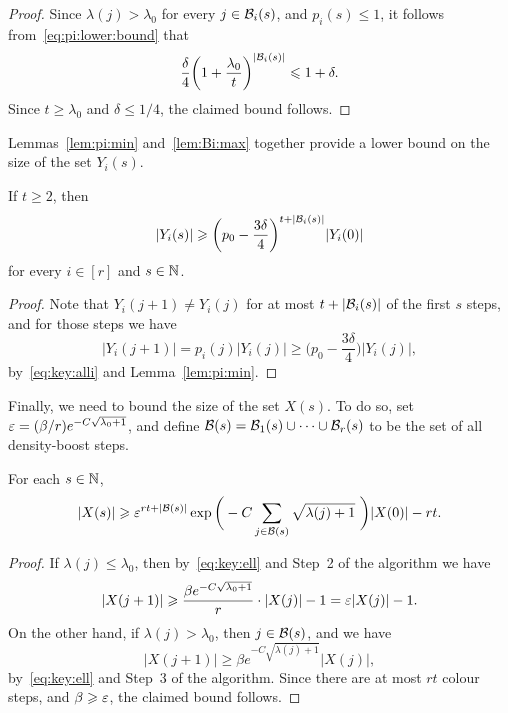 \begin{proof}
  Since $\lambda(j) > \lambda_0$ for every $j \in \mathcal{B}_i(s)$, and $p_i(s) \le 1$, it follows from~\eqref{eq:pi:lower:bound} that
  $$\frac{\delta}{4} \bigg( 1 + \frac{\lambda_0}{t} \bigg)^{|\mathcal{B}_i(s)|} \leqslant 1 + \delta.$$
  Since $t \ge \lambda_0$ and $\delta \le 1/4$, the claimed bound follows. 
\end{proof}

Lemmas~\ref{lem:pi:min} and~\ref{lem:Bi:max} together provide a lower bound on the size of the set $Y_i(s)$. 

\begin{lemma}\label{lem:Y:lower:bound}
  If\/ $t \ge 2$, then
  $$|Y_i(s)| \geqslant \bigg( p_0 - \frac{3\delta}{4} \bigg)^{t + |\mathcal{B}_i(s)|} |Y_i(0)|$$
  for every $i \in [r]$ and $s \in \mathbb{N}$. 
\end{lemma}
  
\begin{proof}
  Note that $Y_i(j+1) \ne Y_i(j)$ for at most $t + |\mathcal{B}_i(s)|$ of the first $s$ steps, and for those steps we have
  $$|Y_i(j+1)| = p_i(j) |Y_i(j)| \ge \bigg( p_0 - \frac{3\delta}{4} \bigg) |Y_i(j)|,$$ 
  by~\eqref{eq:key:alli} and Lemma~\ref{lem:pi:min}.
\end{proof}


Finally, we need to bound the size of the set $X(s)$. To do so, set $\varepsilon = (\beta / r) e^{- C \sqrt{\lambda_0 + 1}}$, and define $\mathcal{B}(s) = \mathcal{B}_1(s) \cup \cdots \cup \mathcal{B}_r(s)$ to be the set of all density-boost steps. 

\begin{lemma}\label{lem:X:lower:bound}
  For each $s \in \mathbb{N}$, 
  \begin{equation}\label{eq:X:lower:bound}
  |X(s)| \geqslant \varepsilon^{rt + |\mathcal{B}(s)|} \exp\bigg( - C \sum_{j \in \mathcal{B}(s)} \sqrt{\lambda(j)+1}\,\, \bigg) |X(0)| - rt.
  \end{equation}
\end{lemma}

\begin{proof}
  If $\lambda(j) \le \lambda_0$, then by~\eqref{eq:key:ell} and Step~2 of the algorithm we have
  $$|X(j+1)| \geqslant \frac{\beta e^{- C \sqrt{\lambda_0 + 1}}}{r} \cdot |X(j)| - 1 = \varepsilon |X(j)| - 1.$$ 
  On the other hand, if $\lambda(j) > \lambda_0$, then $j \in \mathcal{B}(s)$, and we have 
  $$|X(j+1)| \ge \beta e^{- C \sqrt{\lambda(j) + 1}} |X(j)|,$$ 
  by~\eqref{eq:key:ell} and Step~3 of the algorithm. Since there are at most $rt$ colour steps, and $\beta \geqslant \varepsilon$, the claimed bound follows.
\end{proof}

